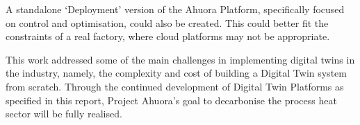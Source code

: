 A standalone `Deployment' version of the Ahuora Platform, specifically focused on control and optimisation, could also be created. 
This could better fit the constraints of a real factory, where cloud platforms may not be appropriate.


This work addressed some of the main challenges in implementing digital twins in the industry, namely, the complexity and cost of building a Digital Twin system from scratch. Through the continued development of Digital Twin Platforms as specified in this report, Project Ahuora's goal to decarbonise the process heat sector will be fully realised.


